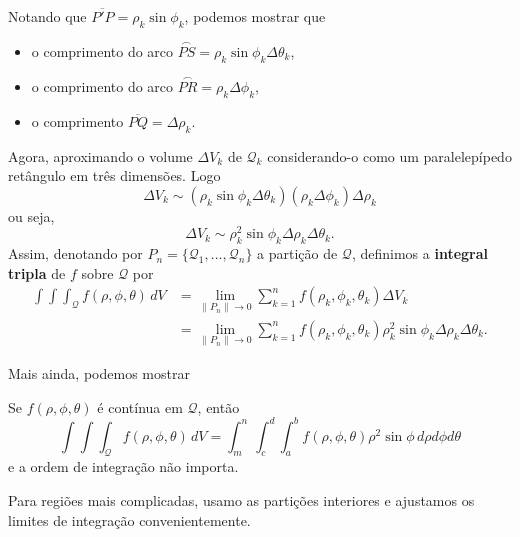 Notando que \(\overline{P'P} = \rho_k \sin\phi_k\), podemos mostrar que
    \begin{itemize}
        \item o comprimento do arco \(\overset{\frown}{PS} = \rho_k \sin\phi_k\Delta\theta_k\),
        \item o comprimento do arco \(\overset{\frown}{PR} = \rho_k \Delta\phi_k\),
        \item o comprimento \(\overline{PQ} = \Delta\rho_k\).
    \end{itemize}

Agora, aproximando o volume \(\Delta V_k\) de \(\mathcal{Q}_k\) considerando-o como um paralelepípedo retângulo em três dimensões. Logo \[\Delta V_k \sim (\rho_k \sin\phi_k \Delta\theta_k) (\rho_k \Delta\phi_k)\Delta\rho_k\] ou seja, \[\Delta V_k \sim \rho_k^2\sin\phi_k\Delta\rho_k\Delta\theta_k.\] Assim, denotando por \(P_n = \{\mathcal{Q}_1,\dots,\mathcal{Q}_n\}\) a partição de \(\mathcal{Q}\), definimos a \textbf{integral tripla} de \(f\) sobre \(\mathcal{Q}\) por
    \begin{align*}
        \int\int\int_\mathcal{Q} f(\rho,\phi,\theta)\, dV
            & = \lim_{\|P_n\|\to 0} \sum_{k=1}^{n} f(\rho_k,\phi_k,\theta_k) \Delta V_k \\
            & = \lim_{\|P_n\|\to 0} \sum_{k=1}^{n} f(\rho_k,\phi_k,\theta_k) \rho_k^2 \sin\phi_k\Delta\rho_k\Delta\theta_k.
    \end{align*}

Mais ainda, podemos mostrar
\begin{theorem}
    Se \(f(\rho,\phi,\theta)\) é contínua em \(\mathcal{Q}\), então \[\int\int\int_\mathcal{Q} f(\rho,\phi,\theta)\, dV = \int_m^n \int_c^d \int_a^b f(\rho,\phi,\theta) \rho^2 \sin\phi\, d\rho d\phi d\theta\] e a ordem de integração não importa.
\end{theorem}

Para regiões mais complicadas, usamo as partições interiores e ajustamos os limites de integração convenientemente.

